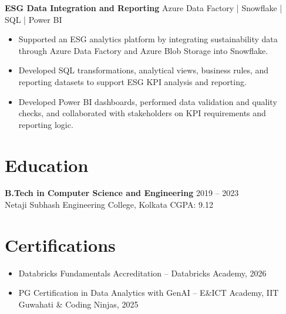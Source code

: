 \documentclass[10pt,a4paper]{article}
\newcommand{\resumeItem}[1]{
    \item \small{#1}
}
\newcommand{\projectHeading}[2]{
    \textbf{#1} \hfill {\small #2}\\[-2pt]
}
\begin{document}

\projectHeading
{ESG Data Integration and Reporting}
{Azure Data Factory | Snowflake | SQL | Power BI}

\begin{itemize}

\resumeItem{Supported an ESG analytics platform by integrating sustainability data through Azure Data Factory and Azure Blob Storage into Snowflake.}

\resumeItem{Developed SQL transformations, analytical views, business rules, and reporting datasets to support ESG KPI analysis and reporting.}

\resumeItem{Developed Power BI dashboards, performed data validation and quality checks, and collaborated with stakeholders on KPI requirements and reporting logic.}

\vspace{4pt}

\end{itemize}






\section{Education}

\textbf{B.Tech in Computer Science and Engineering}
\hfill 2019 -- 2023\\
Netaji Subhash Engineering College, Kolkata
\hfill CGPA: 9.12


\section{Certifications}

\begin{itemize}

\resumeItem{Databricks Fundamentals Accreditation -- Databricks Academy, 2026}

\resumeItem{PG Certification in Data Analytics with GenAI -- E\&ICT Academy, IIT Guwahati \& Coding Ninjas, 2025}

\end{itemize}
\end{document}

